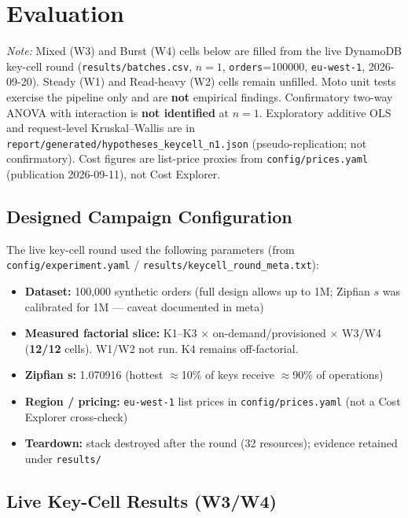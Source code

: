 \section{Evaluation}

\textit{Note:} Mixed (W3) and Burst (W4) cells below are filled from the live DynamoDB key-cell round (\texttt{results/batches.csv}, $n{=}1$, \texttt{orders}{=}100000, \texttt{eu-west-1}, 2026-09-20). Steady (W1) and Read-heavy (W2) cells remain unfilled. Moto unit tests exercise the pipeline only and are \textbf{not} empirical findings. Confirmatory two-way ANOVA with interaction is \textbf{not identified} at $n{=}1$. Exploratory additive OLS and request-level Kruskal--Wallis are in \texttt{report/generated/hypotheses\_keycell\_n1.json} (pseudo-replication; not confirmatory). Cost figures are list-price proxies from \texttt{config/prices.yaml} (publication 2026-09-11), not Cost Explorer.

\subsection{Designed Campaign Configuration}

The live key-cell round used the following parameters (from \texttt{config/experiment.yaml} / \texttt{results/keycell\_round\_meta.txt}):

\begin{itemize}
    \item \textbf{Dataset:} 100{,}000 synthetic orders (full design allows up to 1M; Zipfian $s$ was calibrated for 1M --- caveat documented in meta)
    \item \textbf{Measured factorial slice:} K1--K3 $\times$ on-demand/provisioned $\times$ W3/W4 (\textbf{12/12} cells). W1/W2 not run. K4 remains off-factorial.
    \item \textbf{Zipfian s:} 1.070916 (hottest $\approx$10\% of keys receive $\approx$90\% of operations)
    \item \textbf{Region / pricing:} \texttt{eu-west-1} list prices in \texttt{config/prices.yaml} (not a Cost Explorer cross-check)
    \item \textbf{Teardown:} stack destroyed after the round (32 resources); evidence retained under \texttt{results/}
\end{itemize}

\subsection{Live Key-Cell Results (W3/W4)}

